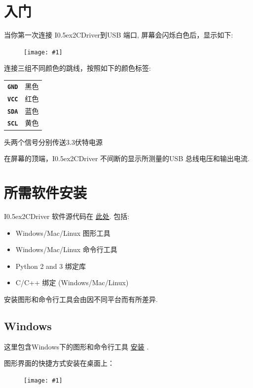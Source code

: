 \documentclass{article}
\newcommand{\two}{\raise0.5ex\hbox{\footnotesize{2}}}
\newcommand{\iicdriver}{I\two{}CDriver}
\newcommand{\png}[1]{
\begin{figure}[H]
\begin{center}
\texttt{[image: \#1]}
\end{center}
\end{figure}
}
\newcommand{\pngw}[2]{
\begin{figure}[H]
\begin{center}
\texttt{[image: \#1]}
\end{center}
\end{figure}
}
\newcommand{\mach}[1]{\texttt{\textbf{#1}}}
\newcommand{\gap}{\vspace{10pt}}
\begin{document}
\newpage
\section{入门}

当你第一次连接 \iicdriver{}到USB 端口, 屏幕会闪烁白色后，显示如下:

\png{img/i2cdriver/DSC_9039}

连接三组不同颜色的跳线，按照如下的颜色标签:

\gap
\begin{center}
\begin{tabular}{ll}
\hline
\mach{GND}  & 黑色 \\
\mach{VCC}  & 红色 \\
\mach{SDA}  & 蓝色 \\
\mach{SCL}  & 黄色 \\
\hline
\end{tabular}
\end{center}
\gap

头两个信号分别传送3.3伏特电源 

在屏幕的顶端，\iicdriver{} 不间断的显示所测量的USB 总线电压和输出电流.

\newpage
\section{所需软件安装}

\iicdriver{} 软件源代码在
\href{https://github.com/jamesbowman/i2cdriver}{此处}.
包括:

\begin{itemize}
\item  Windows/Mac/Linux 图形工具
\item  Windows/Mac/Linux 命令行工具
\item Python 2 and 3 绑定库
\item C/C++ 绑定 (Windows/Mac/Linux)
\end{itemize}

安装图形和命令行工具会由因不同平台而有所差异.

\subsection{Windows}

这里包含Windows下的图形和命令行工具
\href{https://i2cdriver.com/windows}{安装} .

图形界面的快捷方式安装在桌面上： 

\pngw{img/i2cdriver/win32-icon}{.3}
\end{document}
